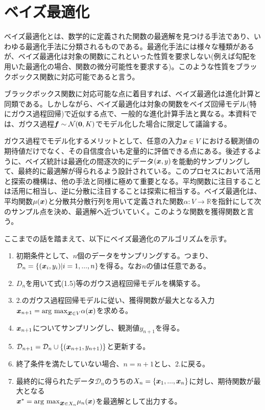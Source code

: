 \documentclass[dvipdfmx, 9pt, a4paper]{jsarticle}
\numberwithin{equation}{section}
\newcommand{\bm}[1]{{\mbox{\boldmath $#1$}}}
\begin{document}
\section{ベイズ最適化}
ベイズ最適化とは、数学的に定義された関数の最適解を見つける手法であり、いわゆる最適化手法に分類されるものである。最適化手法には様々な種類があるが、ベイズ最適化は対象の関数にこれといった性質を要求しない(例えば勾配を用いた最適化の場合、関数の微分可能性を要求する)。このような性質をブラックボックス関数に対応可能であると言う。\par
ブラックボックス関数に対応可能な点に着目すれば、ベイズ最適化は進化計算と同類である。しかしながら、ベイズ最適化は対象の関数をベイズ回帰モデル(特にガウス過程回帰)で近似する点で、一般的な進化計算手法と異なる。本資料では、ガウス過程$\bm f \sim \mathcal{N}(\bm 0, K)$でモデル化した場合に限定して議論する。\par
ガウス過程でモデル化するメリットとして、任意の入力$\bm x \in V$における観測値の期待値だけでなく、その自信度合いも定量的に評価できる点にある。後述するように、ベイズ統計は最適化の間逐次的にデータ$(\bm x, y)$を能動的サンプリングして、最終的に最適解が得られるよう設計されている。このプロセスにおいて活用と探索の機構は、他の手法と同様に極めて重要となる。平均関数に注目することは活用に相当し、逆に分散に注目することは探索に相当する。ベイズ最適化は、平均関数$\mu(\bm x)$と分散共分散行列を用いて定義された関数$\alpha:V \to \mathbb{R}$を指針にして次のサンプル点を決め、最適解へ近づいていく。このような関数を獲得関数と言う。\par
ここまでの話を踏まえて、以下にベイズ最適化のアルゴリズムを示す。
\begin{tcolorbox}[title=ベイズ最適化のアルゴリズム]
\begin{enumerate}
\item 初期条件として、$n$個のデータをサンプリングする。つまり、$\mathcal{D}_n=\{(\bm x_i, y_i)|i=1,...,n\}$を得る。なお$n$の値は任意である。
\item $D_n$を用いて式(1.5)等のガウス過程回帰モデルを構築する。
\item 2.のガウス過程回帰モデルに従い、獲得関数が最大となる入力$\bm x_{n+1}={\rm arg~max}_{\bm x \in V}\alpha(\bm x)$を求める。
\item $\bm x_{n+1}$についてサンプリングし、観測値$y_{n+1}$を得る。
\item $\mathcal{D}_{n+1}=\mathcal{D}_n \cup \{(\bm x_{n+1}, y_{n+1})\}$と更新する。
\item 終了条件を満たしていない場合、$n=n+1$とし、2.に戻る。
\item 最終的に得られたデータ$\mathcal{D}_n$のうちの$X_n=\{\bm x_1, ..., \bm x_n\}$に対し、期待関数が最大となる\\$\bm x^*={\rm arg~max}_{\bm x \in X_n}\mu_n(\bm x)$を最適解として出力する。
\end{enumerate}
\end{tcolorbox}\par
\end{document}
